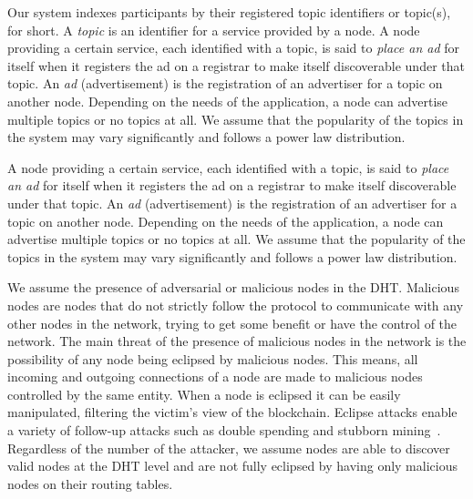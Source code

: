 Our system indexes participants by their registered topic identifiers or topic(s), for short. A \emph{topic} is an identifier for a service provided by a node. A node providing a certain service, each identified with a topic, is said to \emph{place an ad} for itself when it registers the ad on a registrar to make itself discoverable under that topic. An \emph{ad} (\ie advertisement) is the registration of an advertiser for a topic on another node. Depending on the needs of the application, a node can advertise multiple topics or no topics at all. We assume that the popularity of the topics in the system may vary significantly and follows a power law distribution. 

A node providing a certain service,  each identified with a topic,  is said to \emph{place an ad} for itself when it registers the ad on a registrar to make itself discoverable under that topic. 
An \emph{ad} (\ie advertisement) is the registration of an advertiser for a topic on another node. Depending on the needs of the application, a node can advertise multiple topics or no topics at all. 
We assume that the popularity of the topics in the system may vary significantly and follows a power law distribution. 

We assume the presence of adversarial or malicious nodes in the DHT. 
Malicious nodes are nodes that do not strictly follow the protocol to communicate with any other nodes in the network,  trying to get some benefit or have the control of the network.
The main threat of the presence of malicious nodes in the network is the possibility of any node being eclipsed by malicious nodes.
This means,  all incoming and outgoing connections of a node are made to malicious nodes controlled by the same entity. 
When a node is eclipsed it can be easily manipulated,
filtering the victim’s view of the blockchain.  
Eclipse attacks
enable a variety of follow-up attacks such as double spending
and stubborn mining~\cite{stubborn}.
Regardless of the number of the attacker, we assume nodes are able to discover valid nodes at the DHT level and are not fully eclipsed by having only malicious nodes on their routing tables.
%


